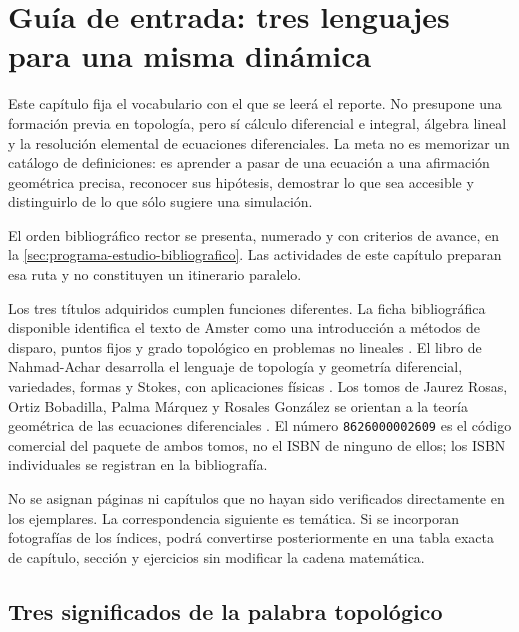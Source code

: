 \section{Guía de entrada: tres lenguajes para una misma dinámica}
\label{sec:ruta-geometrica-libros}

Este capítulo fija el vocabulario con el que se leerá el reporte. No presupone una
formación previa en topología, pero sí cálculo diferencial e integral, álgebra
lineal y la resolución elemental de ecuaciones diferenciales. La meta no es
memorizar un catálogo de definiciones: es aprender a pasar de una ecuación a
una afirmación geométrica precisa, reconocer sus hipótesis, demostrar lo que
sea accesible y distinguirlo de lo que sólo sugiere una simulación.

El orden bibliográfico rector se presenta, numerado y con criterios de avance,
en la \cref{sec:programa-estudio-bibliografico}. Las actividades de este
capítulo preparan esa ruta y no constituyen un itinerario paralelo.

Los tres títulos adquiridos cumplen funciones diferentes. La ficha
bibliográfica disponible identifica el texto de Amster como una introducción
a métodos de disparo, puntos fijos y grado topológico en problemas no lineales
\cite{Amster2021MetodosTopologicos}. El libro de Nahmad-Achar desarrolla el
lenguaje de topología y geometría diferencial, variedades, formas y Stokes,
con aplicaciones físicas \cite{NahmadAchar2022Topologia}. Los tomos de
Jaurez Rosas, Ortiz Bobadilla, Palma Márquez y Rosales González se orientan
a la teoría geométrica de las ecuaciones diferenciales
\cite{JaurezEtAl2021TGEDI,JaurezEtAl2021TGEDII}. El número
\texttt{8626000002609} es el código comercial del paquete de ambos tomos, no el
ISBN de ninguno de ellos; los ISBN individuales se registran en la
bibliografía.

\begin{remark}
No se asignan páginas ni capítulos que no hayan sido verificados directamente
en los ejemplares. La correspondencia siguiente es temática. Si se incorporan
fotografías de los índices, podrá convertirse posteriormente en una tabla
exacta de capítulo, sección y ejercicios sin modificar la cadena matemática.
\end{remark}

\subsection{Tres significados de la palabra topológico}

